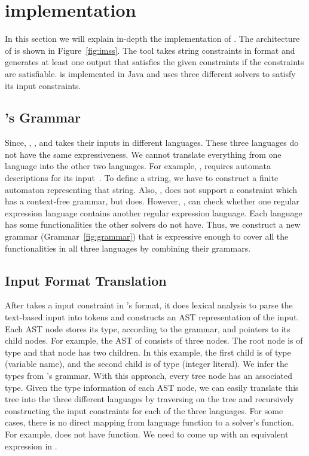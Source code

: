 \section{implementation}
\label{sec:implementation}
In this section we will explain in-depth the implementation of \imss.
The architecture of \imss is shown
in Figure~\ref{fig:imss}. The tool takes string constraints in \imss format
and generates at least one output that satisfies the given constraints if the constraints are satisfiable.
\imss is implemented in Java and uses three different solvers to satisfy its input constraints.


\subsection{\imss's Grammar}
Since, \hampi, \dprle, and \zstr takes their inputs in
 different languages. These three languages do not have the same expressiveness.
 We cannot translate everything from one language into the other two languages. For example,
 \dprle, requires automata descriptions for its input~\cite{lazystrings2010}.
 To define a string, we have to construct a finite automaton representing that string.
 Also, \dprle, does not support a constraint which has a context-free grammar,
 but \hampi does. However, \dprle, can check whether one regular expression language
 contains another regular expression language. Each language has some functionalities the
 other solvers do not have. Thus, we construct a new grammar (Grammar~\ref{fig:grammar}) that is expressive enough to
 cover all the functionalities in all three languages by combining their grammars.

\subsection{Input Format Translation}
After \imss takes a input constraint in \imss's format, it does lexical analysis to parse
the text-based input into tokens and constructs an AST representation of the input.
Each AST node stores its type, according to the grammar, and pointers to its child nodes.
For example, the AST of  consists of three nodes. The root node is of type
 and that node has two children. In this example, the first child is of type  (variable name), and
the second child is of type  (integer literal). We infer the types from \imss's grammar.
With this approach, every tree node has an associated type. Given the type information of
each AST node, we can easily translate this tree into the three different languages by traversing
on the tree and recursively constructing the input constraints for each of the three languages.
For some cases, there is no direct mapping from \imss language function to a solver's function.
For example, \dprle does not have  function. We need to come up with an equivalent
expression in \dprle.

